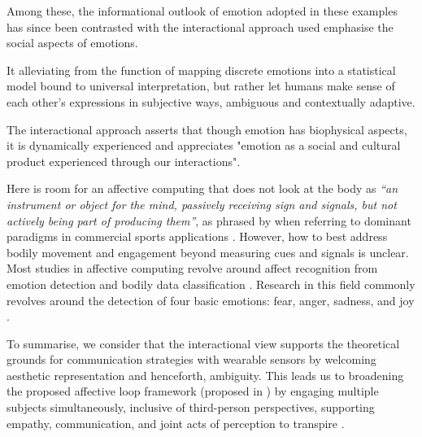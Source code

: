 
Among these, the informational outlook of emotion adopted in these examples has since been contrasted with the interactional approach used emphasise the social aspects of emotions.

It alleviating from the function of mapping discrete emotions into a statistical model bound to universal interpretation, but rather let humans make sense of each other's expressions in subjective ways, ambiguous and contextually adaptive.


The interactional approach asserts that though emotion has biophysical aspects, it is dynamically experienced and appreciates "emotion as a social and cultural product experienced through our interactions".

Here is room for an affective computing that does not look at the body as \textit{“an instrument or object for the mind, passively receiving sign and signals, but not actively being part of producing them”}, as phrased by \citeauthor{hook_kristina_affective_2012} when referring to dominant paradigms in commercial sports applications \cite{hook_kristina_affective_2012}. However, how to best address bodily movement and engagement beyond measuring cues and signals is unclear. Most studies in affective computing revolve around affect recognition from emotion detection and bodily data classification \cite{bota_review_2019}. Research in this field commonly revolves around the detection of four basic emotions: fear, anger, sadness, and joy \cite{picard_mit_nodate}.

To summarise, we consider that the interactional view supports the theoretical grounds for communication strategies with wearable sensors by welcoming aesthetic representation and henceforth, ambiguity. This leads us to broadening the proposed affective loop framework (proposed in \cite{hook_affective_2009}) by engaging multiple subjects simultaneously, inclusive of third-person perspectives, supporting empathy, communication, and joint acts of perception to transpire \cite{turmo_vidal_designing_2021,francoise_designing_2017}.

